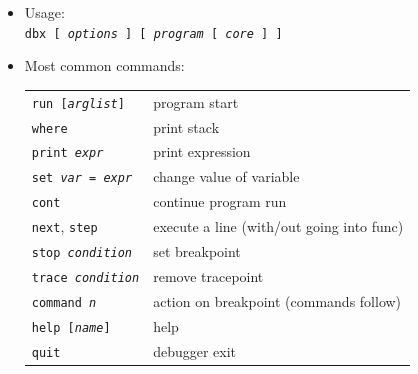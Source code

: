 
\begin{slide}
\begin{itemize}
\item Usage:\\
\texttt{dbx [ \emph{options} ] [ \emph{program} [ \emph{core} ] ]}
\item Most common commands:\\
\renewcommand{\arraystretch}{0.9}
\begin{tabular}{ll}
\texttt{run [\emph{arglist}]} & program start\\
\texttt{where} & print stack\\
\texttt{print \emph{expr}} & print expression\\
\texttt{set \emph{var} = \emph{expr}} & change value of variable\\
\texttt{cont} & continue program run\\
\texttt{next}, \texttt{step} & execute a line (with/out going into func)\\
\texttt{stop \emph{condition}} & set breakpoint\\
\texttt{trace \emph{condition}} & remove tracepoint\\
\texttt{command \emph{n}} & action on breakpoint (commands follow)\\
\texttt{help [\emph{name}]} & help\\
\texttt{quit} & debugger exit
\end{tabular}
\end{itemize}
\end{slide}

